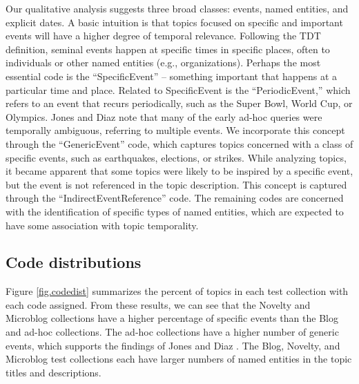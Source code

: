 \documentclass[runningheads,a4paper]{llncs}
\begin{document}
Our qualitative analysis suggests three broad classes: events, named entities, and explicit dates. A basic intuition is that topics focused on specific and important events will have a higher degree of temporal relevance. Following the TDT definition, seminal events happen at specific times in specific places, often to individuals or other named entities (e.g., organizations). Perhaps the most essential code is the ``SpecificEvent'' -- something important that happens at a particular time and place. Related to SpecificEvent is the ``PeriodicEvent,'' which refers to an event that recurs periodically, such as the Super Bowl, World Cup, or Olympics. Jones and Diaz \cite{Jones2007} note that many of the early ad-hoc queries were temporally ambiguous, referring to multiple events. We incorporate this concept through the ``GenericEvent'' code, which captures topics concerned with a class of specific events, such as earthquakes, elections, or strikes. While analyzing topics, it became apparent that some topics were likely to be inspired by a specific event, but the event is not referenced in the topic description. This concept is captured through the ``IndirectEventReference'' code. The remaining codes are concerned with the identification of specific types of named entities, which are expected to have some  association with topic temporality.


\subsection{Code distributions}

Figure \ref{fig.codedist} summarizes the percent of topics in each test collection with each code assigned. From these results, we can see that the Novelty and Microblog  collections have a higher percentage of specific events than the Blog and ad-hoc collections. The ad-hoc collections have a higher number of generic events, which supports the findings of Jones and Diaz \cite{Jones2007}. The Blog, Novelty, and Microblog test collections each have larger numbers of named entities in the topic titles and descriptions.
\end{document}
